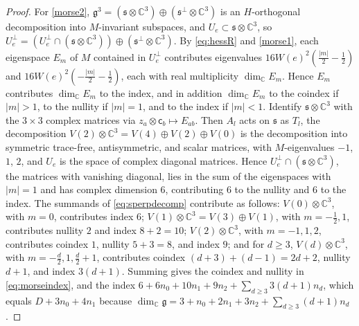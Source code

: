 \documentclass[leqno,10pt]{amsart}
\theoremstyle{definition}
\numberwithin{equation}{section}
\newcommand{\g}{\mathfrak{g}}
\newcommand{\com}{\mathbb C}
\newcommand{\subs}{\mathfrak{s}}
\newcommand{\Usp}{U}
\newcommand{\Uperp}{\Usp^{\perp}}
\begin{document}
\begin{proof}
For \ref{morse2}, $\g^{3} = (\subs \otimes \com^{3}) \oplus (\subs^{\perp}\otimes \com^{3})$ is an $H$-orthogonal decomposition into $M$-invariant subspaces, and $\Usp_{e} \subset \subs \otimes \com^{3}$, so $\Uperp_{e} = (\Uperp_{e} \cap (\subs \otimes \com^{3})) \oplus (\subs^{\perp}\otimes \com^{3})$. By \eqref{eq:hessR} and \ref{morse1}, each eigenspace $E_{m}$ of $M$ contained in $\Uperp_{e}$ contributes eigenvalues $16W(e)^{2}(\tfrac{|m|}{2} - \tfrac{1}{2})$ and $16W(e)^{2}(-\tfrac{|m|}{2} - \tfrac{1}{2})$, each with real multiplicity $\dim_{\com}E_{m}$. Hence $E_{m}$ contributes $\dim_{\com}E_{m}$ to the index, and in addition $\dim_{\com}E_{m}$ to the coindex if $|m| > 1$, to the nullity if $|m| = 1$, and to the index if $|m| < 1$. Identify $\subs \otimes \com^{3}$ with the $3\times 3$ complex matrices via $z_{a} \otimes \mathsf{c}_{b} \mapsto E_{ab}$. Then $A_{l}$ acts on $\subs$ as $T_{l}$, the decomposition $V(2) \otimes \com^{3} = V(4) \oplus V(2) \oplus V(0)$ is the decomposition into symmetric trace-free, antisymmetric, and scalar matrices, with $M$-eigenvalues $-1$, $1$, $2$, and $\Usp_{e}$ is the space of complex diagonal matrices. Hence $\Uperp_{e} \cap (\subs \otimes \com^{3})$, the matrices with vanishing diagonal, lies in the sum of the eigenspaces with $|m| = 1$ and has complex dimension $6$, contributing $6$ to the nullity and $6$ to the index. The summands of \eqref{eq:sperpdecomp} contribute as follows: $V(0)\otimes\com^{3}$, with $m = 0$, contributes index $6$; $V(1)\otimes\com^{3} = V(3) \oplus V(1)$, with $m = -\tfrac{1}{2}, 1$, contributes nullity $2$ and index $8 + 2 = 10$; $V(2)\otimes\com^{3}$, with $m = -1, 1, 2$, contributes coindex $1$, nullity $5 + 3 = 8$, and index $9$; and for $d \geq 3$, $V(d)\otimes\com^{3}$, with $m = -\tfrac{d}{2}, 1, \tfrac{d}{2}+1$, contributes coindex $(d+3) + (d-1) = 2d+2$, nullity $d+1$, and index $3(d+1)$. Summing gives the coindex and nullity in \eqref{eq:morseindex}, and the index $6 + 6n_{0} + 10n_{1} + 9n_{2} + \sum_{d \geq 3}3(d+1)n_{d}$, which equals $D + 3n_{0} + 4n_{1}$ because $\dim_{\com}\g = 3 + n_{0} + 2n_{1} + 3n_{2} + \sum_{d \geq 3}(d+1)n_{d}$.


\end{proof}
\end{document}
